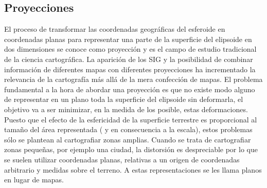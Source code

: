 \subsection{Proyecciones}
El proceso de transformar las coordenadas geográficas del esferoide en coordenadas planas para representar una
parte de la superficie del elipsoide en dos dimensiones se conoce como proyección y es el campo de estudio
tradicional de la ciencia cartográfica. La aparición de los SIG y la posibilidad de combinar información de
diferentes mapas con diferentes proyecciones ha incrementado la relevancia de la cartografía más allá de la
mera confección de mapas.
El problema fundamental a la hora de abordar una proyección es que no existe modo alguno de representar en un
plano toda la superficie del elipsoide sin deformarla, el objetivo va a ser minimizar, en la medida de los posible,
estas deformaciones. Puesto que el efecto de la esfericidad de la superficie terrestre es proporcional al tamaño
del área representada ( y en consecuencia a la escala), estos problemas sólo se plantean al cartografiar zonas
amplias. Cuando se trata de cartografiar zonas pequeñas, por ejemplo una ciudad, la distorsión es despreciable
por lo que se suelen utilizar coordenadas planas, relativas a un origen de coordenadas arbitrario y medidas sobre
el terreno. A estas representaciones se les llama planos en lugar de mapas.


